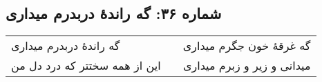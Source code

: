 \begin{center}
\section*{شماره ۳۶: گه راندۀ دربدرم میداری}
\label{sec:036}
\begin{longtable}{l p{0.5cm} r}
گه راندهٔ دربدرم میداری
&&
گه غرقهٔ خون جگرم میداری
\\
این از همه سختتر که درد دل من
&&
میدانی و زیر و زبرم میداری
\\
\end{longtable}
\end{center}
